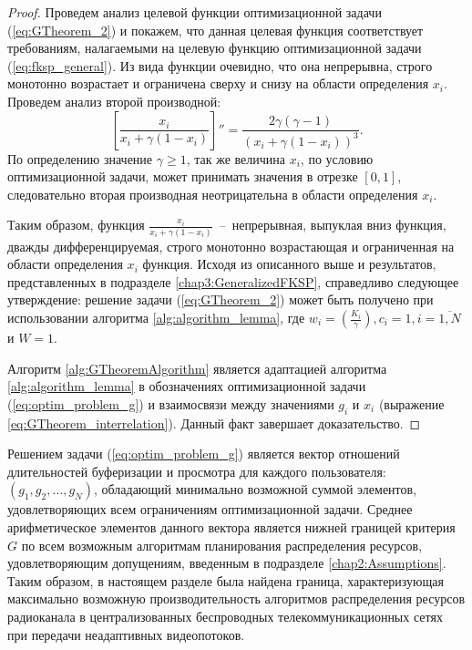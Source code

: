 \begin{proof}
Проведем анализ целевой функции оптимизационной задачи (\ref{eq:GTheorem_2}) и покажем, что данная целевая функция соответствует требованиям, налагаемыми на целевую функцию оптимизационной задачи (\ref{eq:fksp_general}). Из вида функции очевидно, что она непрерывна, строго монотонно возрастает и ограничена сверху и снизу на области определения $x_i$. Проведем анализ второй производной:
$$\left[\frac{x_i}{x_i + \gamma (1-x_i)}\right]'' = \frac{2\gamma(\gamma - 1)}{(x_i + \gamma(1 - x_i))^3}.$$
По определению значение $\gamma \geq 1$, так же величина $x_i$, по условию оптимизационной задачи, может принимать значения в отрезке $[0,1]$, следовательно вторая производная неотрицательна в области определения $x_i$.

Таким образом, функция $\frac{x_i}{x_i + \gamma (1-x_i)}$~--~непрерывная, выпуклая вниз функция, дважды дифференцируемая, строго монотонно возрастающая и ограниченная на области определения $x_i$ функция. Исходя из описанного выше и результатов, представленных в подразделе \ref{chap3:GeneralizedFKSP}, справедливо следующее утверждение: решение задачи (\ref{eq:GTheorem_2}) может быть получено при использовании алгоритма \ref{alg:algorithm_lemma}, где $w_i = \left(\frac{K_i}{\gamma}\right), c_i = 1, i=\overline{1,N}$ и $W = 1$.

Алгоритм \ref{alg:GTheoremAlgorithm} является адаптацией алгоритма \ref{alg:algorithm_lemma} в обозначениях оптимизационной задачи (\ref{eq:optim_problem_g}) и взаимосвязи между значениями $g_i$ и $x_i$ (выражение \ref{eq:GTheorem_interrelation}). Данный факт завершает доказательство.
\end{proof}

Решением задачи (\ref{eq:optim_problem_g}) является вектор отношений длительностей буферизации и просмотра для каждого пользователя: $(g_1, g_2, \ldots, g_N)$, обладающий минимально возможной суммой элементов, удовлетворяющих всем ограничениям оптимизационной задачи. Среднее арифметическое элементов данного вектора является нижней границей критерия $G$ по всем возможным алгоритмам планирования распределения ресурсов, удовлетворяющим допущениям, введенным в подразделе \ref{chap2:Assumptions}. Таким образом, в настоящем разделе была найдена граница, характеризующая максимально возможную производительность алгоритмов распределения ресурсов радиоканала в централизованных беспроводных телекоммуникационных сетях при передачи неадаптивных видеопотоков.

